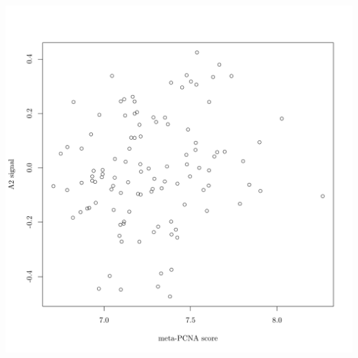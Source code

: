 \documentclass{article}\usepackage[]{graphicx}\usepackage[]{color}
\makeatletter
\def\maxwidth{ %
  \ifdim\Gin@nat@width>\linewidth
    \linewidth
  \else
    \Gin@nat@width
  \fi
}
\newenvironment{knitrout}{}{} %
\makeatother
\begin{document}
\begin{knitrout}
{\centering \includegraphics[width=\maxwidth]{figure/nmf-msigdb-cor-plots-6} 

}



\end{knitrout}
\end{document}
